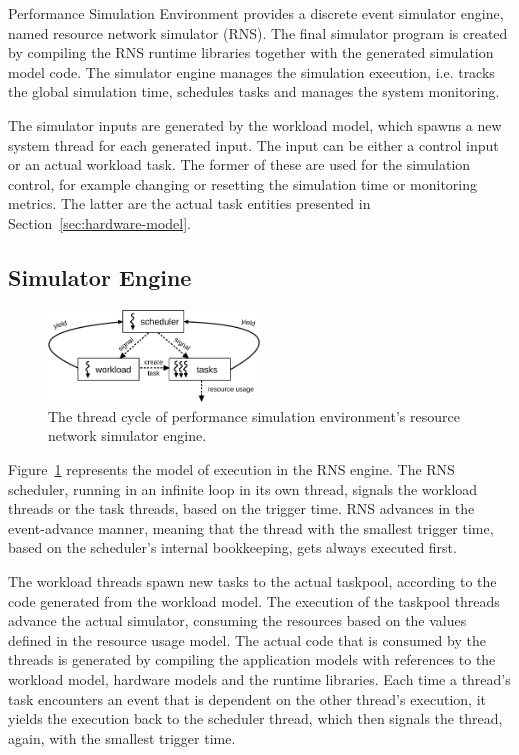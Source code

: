 Performance Simulation Environment provides a discrete event simulator engine, named resource network simulator (RNS). The final simulator program is created by compiling the RNS runtime libraries together with the generated simulation model code. The simulator engine manages the simulation execution, i.e. tracks the global simulation time, schedules tasks and manages the system monitoring.

The simulator inputs are generated by the workload model, which spawns a new system thread for each generated input. The input can be either a control input or an actual workload task. The former of these are used for the simulation control, for example changing or resetting the simulation time or monitoring metrics. The latter are the actual task entities presented in Section~\ref{sec:hardware-model}.

\subsection{Simulator Engine}
\label{sec:simulator-engine}

\begin{figure}[]
  \begin{center}
    \includegraphics[width=0.5\textwidth]{images/rns-threads.pdf}
    \caption{The thread cycle of performance simulation environment's resource network simulator engine.}
    \label{fig:rns-threads}
  \end{center}
\end{figure}

Figure~\ref{fig:rns-threads} represents the model of execution in the RNS engine. The RNS scheduler, running in an infinite loop in its own thread, signals the workload threads or the task threads, based on the trigger time. RNS advances in the event-advance manner, meaning that the thread with the smallest trigger time, based on the scheduler's internal bookkeeping, gets always executed first.

The workload threads spawn new tasks to the actual taskpool, according to the code generated from the workload model. The execution of the taskpool threads advance the actual simulator, consuming the resources based on the values defined in the resource usage model. The actual code that is consumed by the threads is generated by compiling the application models with references to the workload model, hardware models and the runtime libraries. Each time a thread's task encounters an event that is dependent on the other thread's execution, it yields the execution back to the scheduler thread, which then signals the thread, again, with the smallest trigger time.

